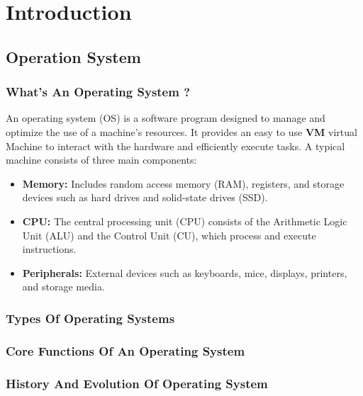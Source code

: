 \section{Introduction}
\subsection{Operation System}
\subsubsection{What's An Operating System ?}
An operating system (OS) is a software program designed to manage and optimize the use of a machine's resources. 
It provides an easy to use \textbf{VM} virtual Machine to interact with the hardware and efficiently execute tasks. 
A typical machine consists of three main components:
\begin{itemize}
    \item \textbf{Memory:} Includes random access memory (RAM), registers, and storage devices such as 
        hard drives and solid-state drives (SSD).
    \item \textbf{CPU:} The central processing unit (CPU) consists of the Arithmetic Logic Unit (ALU) and 
        the Control Unit (CU), which process and execute instructions.
    \item \textbf{Peripherals:} External devices such as keyboards, mice, displays, printers, and storage media.
\end{itemize}
\subsubsection{Types Of Operating Systems}
\subsubsection{Core Functions Of An Operating System}
\subsubsection{History And Evolution Of Operating System}
